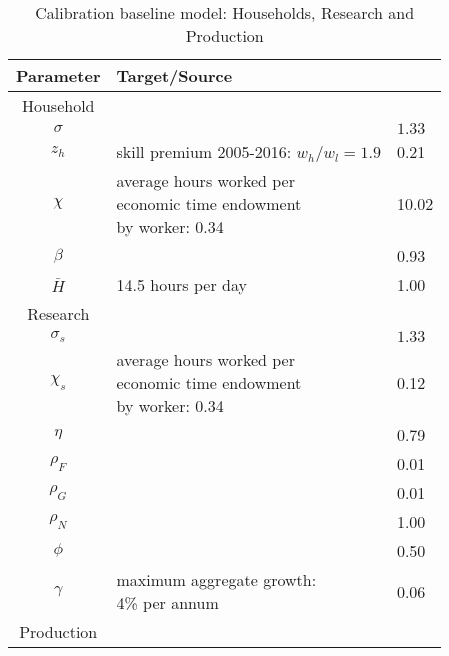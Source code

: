  \begin{table}[h!]
 	\begin{center}
 		\captionsetup{width=0.9\textwidth}
 		\caption{ Calibration baseline model: Households, Research and Production}
 		\label{tab:calib}
 		\begin{tabular}{c|ll}
 			\hline \hline
 			Parameter& Target/Source& \makecell[l]{Calibration}\\ 
 			\hline
 			\hline
 			Household&\multicolumn{2}{c}{}\\
 			\hline 
 			
 			\hline
 			$\sigma$ &  \makecell[l]{\cite{Chetty2011AreMargins}}& $1.33$  \\
 			$z_h$& \makecell[l]{skill premium 2005-2016:\\ $w_h/w_l=1.9$\\ \citep{Slavik2020WagePremium}}&0.21\\	
 			$\chi$ &  \makecell[l]{average hours worked per\\ economic time endowment\\ by worker: 0.34 \cite{OECDHoursworked}}& 10.02 \\
 			$\beta$ &  \makecell[l]{\cite{Barrage2019OptimalPolicy}}& 0.93 \\
 			$\bar{H}$& \makecell[l]{14.5 hours per day\\ \cite{Jones1993OptimalGrowth}}&1.00 \\
 			\hline
 			\hline
 			Research&\multicolumn{2}{c}{}\\
 			\hline
 			
 			\hline
 			$\sigma_s$ &  \makecell[l]{\cite{Chetty2011AreMargins}}& $1.33$\\
 			$\chi_s$ &\makecell[l]{average hours worked per \\ economic time endowment\\ by worker: 0.34 \cite{OECDHoursworked}} & 0.12 \\
 			$\eta$ & & 0.79 \\
 			$\rho_F$ & & 0.01 \\
 			$\rho_G$ &\makecell[l]{\cite{Fried2018ClimateAnalysis}} & 0.01 \\
 			$\rho_N$ & & 1.00 \\
 			$\phi$ && 0.50 \\
 			$\gamma$ &\makecell[l]{maximum aggregate growth:\\4\% per annum} & 0.06\\
 			\hline
 			\hline
 			Production&\multicolumn{2}{c}{}\\
 			\hline
 			

\end{tabular}
\end{center}
\end{table}
